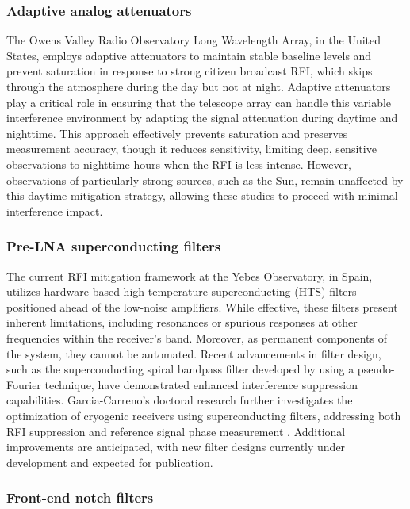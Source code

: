 \subsubsection{Adaptive analog attenuators}

The Owens Valley Radio Observatory Long Wavelength Array, in the United States, employs adaptive attenuators to maintain stable baseline levels and prevent saturation in response to strong citizen broadcast RFI, which skips through the atmosphere during the day but not at night. Adaptive attenuators play a critical role in ensuring that the telescope array can handle this variable interference environment by adapting the signal attenuation during daytime and nighttime. This approach effectively prevents saturation and preserves measurement accuracy, though it reduces sensitivity, limiting deep, sensitive observations to nighttime hours when the RFI is less intense. However, observations of particularly strong sources, such as the Sun, remain unaffected by this daytime mitigation strategy, allowing these studies to proceed with minimal interference impact.

\subsubsection{Pre-LNA superconducting filters}
The current RFI mitigation framework at the Yebes Observatory, in Spain, utilizes hardware-based high-temperature superconducting (HTS) filters positioned ahead of the low-noise amplifiers. While effective, these filters present inherent limitations, including resonances or spurious responses at other frequencies within the receiver’s band. Moreover, as permanent components of the system, they cannot be automated. Recent advancements in filter design, such as the superconducting spiral bandpass filter developed by \citep{huang2018superconducting} using a pseudo-Fourier technique, have demonstrated enhanced interference suppression capabilities. Garcia-Carreno’s doctoral research further investigates the optimization of cryogenic receivers using superconducting filters, addressing both RFI suppression and reference signal phase measurement \citep{garcia2023optimizacion,lopez2021tri}. Additional improvements are anticipated, with new filter designs currently under development and expected for publication.

\subsubsection{Front-end notch filters}

